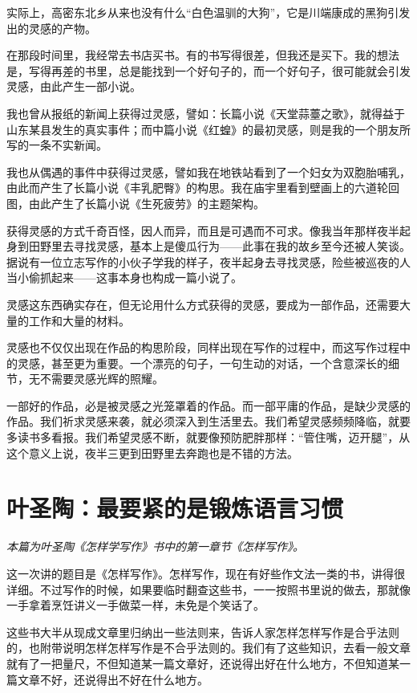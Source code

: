 \documentclass[fontset=fandol,12pt,a5paper]{ctexbook}
\begin{document}
实际上，高密东北乡从来也没有什么“白色温驯的大狗”，它是川端康成的黑狗引发出的灵感的产物。

在那段时间里，我经常去书店买书。有的书写得很差，但我还是买下。我的想法是，写得再差的书里，总是能找到一个好句子的，而一个好句子，很可能就会引发灵感，由此产生一部小说。

我也曾从报纸的新闻上获得过灵感，譬如：长篇小说《天堂蒜薹之歌》，就得益于山东某县发生的真实事件；而中篇小说《红蝗》的最初灵感，则是我的一个朋友所写的一条不实新闻。

我也从偶遇的事件中获得过灵感，譬如我在地铁站看到了一个妇女为双胞胎哺乳，由此而产生了长篇小说《丰乳肥臀》的构思。我在庙宇里看到壁画上的六道轮回图，由此产生了长篇小说《生死疲劳》的主题架构。

获得灵感的方式千奇百怪，因人而异，而且是可遇而不可求。像我当年那样夜半起身到田野里去寻找灵感，基本上是傻瓜行为——此事在我的故乡至今还被人笑谈。据说有一位立志写作的小伙子学我的样子，夜半起身去寻找灵感，险些被巡夜的人当小偷抓起来——这事本身也构成一篇小说了。

灵感这东西确实存在，但无论用什么方式获得的灵感，要成为一部作品，还需要大量的工作和大量的材料。

灵感也不仅仅出现在作品的构思阶段，同样出现在写作的过程中，而这写作过程中的灵感，甚至更为重要。一个漂亮的句子，一句生动的对话，一个含意深长的细节，无不需要灵感光辉的照耀。

一部好的作品，必是被灵感之光笼罩着的作品。而一部平庸的作品，是缺少灵感的作品。我们祈求灵感来袭，就必须深入到生活里去。我们希望灵感频频降临，就要多读书多看报。我们希望灵感不断，就要像预防肥胖那样：“管住嘴，迈开腿”，从这个意义上说，夜半三更到田野里去奔跑也是不错的方法。
\newpage

\section{叶圣陶：最要紧的是锻炼语言习惯}

\emph{本篇为叶圣陶《怎样学写作》书中的第一章节《怎样写作》。}
\vspace{2em}

这一次讲的题目是《怎样写作》。怎样写作，现在有好些作文法一类的书，讲得很详细。不过写作的时候，如果要临时翻查这些书，一一按照书里说的做去，那就像一手拿着烹饪讲义一手做菜一样，未免是个笑话了。

这些书大半从现成文章里归纳出一些法则来，告诉人家怎样怎样写作是合乎法则的，也附带说明怎样怎样写作是不合乎法则的。我们有了这些知识，去看一般文章就有了一把量尺，不但知道某一篇文章好，还说得出好在什么地方，不但知道某一篇文章不好，还说得出不好在什么地方。
\end{document}
